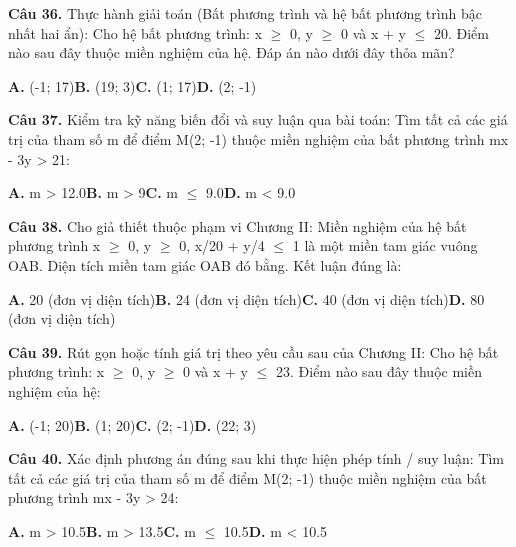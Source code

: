 \documentclass[11pt,a4paper]{article}
\begin{document}
\textbf{\color{primary} Câu 36.} Thực hành giải toán (Bất phương trình và hệ bất phương trình bậc nhất hai ẩn): Cho hệ bất phương trình: x $\ge$ 0, y $\ge$ 0 và x + y $\le$ 20. Điểm nào sau đây thuộc miền nghiệm của hệ. Đáp án nào dưới đây thỏa mãn?\par
\hspace*{1.5em}\textbf{A.} (-1; 17)\quad\quad \textbf{B.} (19; 3)\quad\quad \textbf{C.} (1; 17)\quad\quad \textbf{D.} (2; -1)\par\vspace{2pt}
\textbf{\color{primary} Câu 37.} Kiểm tra kỹ năng biến đổi và suy luận qua bài toán: Tìm tất cả các giá trị của tham số m để điểm M(2; -1) thuộc miền nghiệm của bất phương trình mx - 3y > 21:\par
\hspace*{1.5em}\textbf{A.} m > 12.0\quad\quad \textbf{B.} m > 9\quad\quad \textbf{C.} m $\le$ 9.0\quad\quad \textbf{D.} m < 9.0\par\vspace{2pt}
\textbf{\color{primary} Câu 38.} Cho giả thiết thuộc phạm vi Chương II: Miền nghiệm của hệ bất phương trình x $\ge$ 0, y $\ge$ 0, x/20 + y/4 $\le$ 1 là một miền tam giác vuông OAB. Diện tích miền tam giác OAB đó bằng. Kết luận đúng là:\par
\hspace*{1.5em}\textbf{A.} 20 (đơn vị diện tích)\quad\quad \textbf{B.} 24 (đơn vị diện tích)\quad\quad \textbf{C.} 40 (đơn vị diện tích)\quad\quad \textbf{D.} 80 (đơn vị diện tích)\par\vspace{2pt}
\textbf{\color{primary} Câu 39.} Rút gọn hoặc tính giá trị theo yêu cầu sau của Chương II: Cho hệ bất phương trình: x $\ge$ 0, y $\ge$ 0 và x + y $\le$ 23. Điểm nào sau đây thuộc miền nghiệm của hệ:\par
\hspace*{1.5em}\textbf{A.} (-1; 20)\quad\quad \textbf{B.} (1; 20)\quad\quad \textbf{C.} (2; -1)\quad\quad \textbf{D.} (22; 3)\par\vspace{2pt}
\textbf{\color{primary} Câu 40.} Xác định phương án đúng sau khi thực hiện phép tính / suy luận: Tìm tất cả các giá trị của tham số m để điểm M(2; -1) thuộc miền nghiệm của bất phương trình mx - 3y > 24:\par
\hspace*{1.5em}\textbf{A.} m > 10.5\quad\quad \textbf{B.} m > 13.5\quad\quad \textbf{C.} m $\le$ 10.5\quad\quad \textbf{D.} m < 10.5\par\vspace{2pt}
\end{document}
